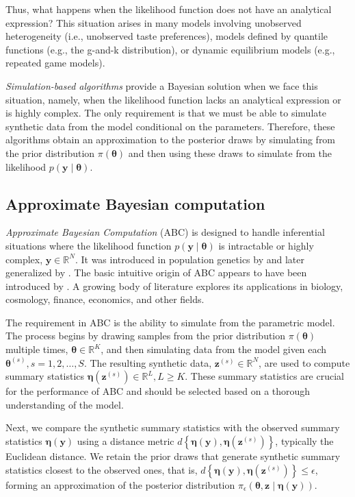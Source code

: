 Thus, what happens when the likelihood function does not have an analytical expression? This situation arises in many models involving unobserved heterogeneity (i.e., unobserved taste preferences), models defined by quantile functions (e.g., the g-and-k distribution), or dynamic equilibrium models (e.g., repeated game models).

\textit{Simulation-based algorithms} provide a Bayesian solution when we face this situation, namely, when the likelihood function lacks an analytical expression or is highly complex. The only requirement is that we must be able to simulate synthetic data from the model conditional on the parameters. Therefore, these algorithms obtain an approximation to the posterior draws by simulating from the prior distribution $\pi(\boldsymbol{\theta})$ and then using these draws to simulate from the likelihood $p(\mathbf{y} \mid \boldsymbol{\theta})$.

\subsection{Approximate Bayesian computation}\label{sec15_12}

\textit{Approximate Bayesian Computation} (ABC) is designed to handle inferential situations where the likelihood function \( p(\boldsymbol{y} \mid \boldsymbol{\theta}) \) is intractable or highly complex, $\boldsymbol{y}\in \mathbb{R}^N$. It was introduced in population genetics by \cite{tavare1997inferring, pritchard1999population} and later generalized by \cite{beaumont2002approximate}. The basic intuitive origin of ABC appears to have been introduced by \cite{rubin1984bayesianly}. A growing body of literature explores its applications in biology, cosmology, finance, economics, and other fields.

The requirement in ABC is the ability to simulate from the parametric model. The process begins by drawing samples from the prior distribution \( \pi({\boldsymbol{\theta}}) \) multiple times, $\boldsymbol{\theta}\in\mathbb{R}^K$, and then simulating data from the model given each \( {\boldsymbol{\theta}^{(s)}}, s=1,2,\dots,S \). The resulting synthetic data, \( \boldsymbol{z}^{(s)} \in \mathbb{R}^N \), are used to compute summary statistics \( \boldsymbol{\eta}(\boldsymbol{z}^{(s)}) \in \mathbb{R}^L, L\geq K \). These summary statistics are crucial for the performance of ABC and should be selected based on a thorough understanding of the model.  

Next, we compare the synthetic summary statistics with the observed summary statistics \( \boldsymbol{\eta}(\boldsymbol{y}) \) using a distance metric \( d\left\{ \boldsymbol\eta ({\boldsymbol y}),{\boldsymbol \eta }({\boldsymbol z}^{(s)})\right\} \), typically the Euclidean distance. We retain the prior draws that generate synthetic summary statistics closest to the observed ones, that is, \( d\left\{ \boldsymbol\eta ({\boldsymbol y}),{\boldsymbol \eta }({\boldsymbol z}^{(s)})\right\}\leq \epsilon \), forming an approximation of the posterior distribution \( \pi_{\epsilon}(\boldsymbol{\theta},\boldsymbol{z} \mid \boldsymbol{\eta}(\boldsymbol{y})) \).

